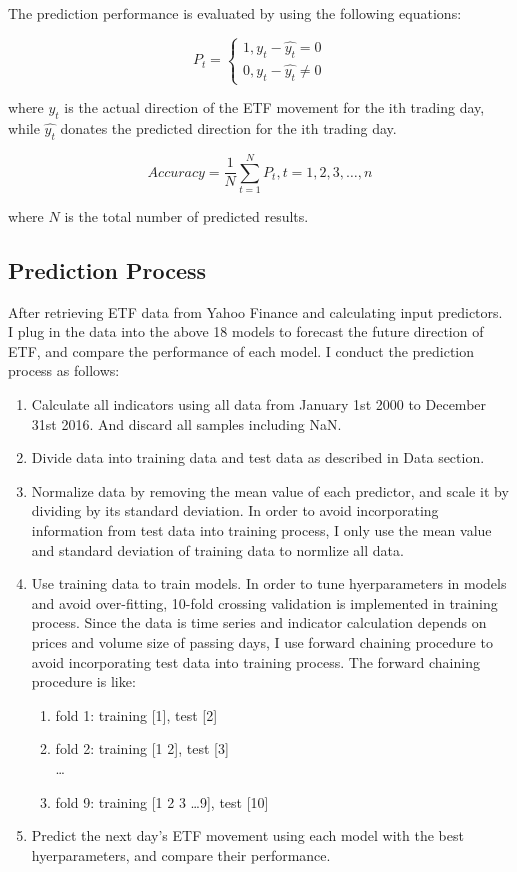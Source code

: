 \documentclass[letterpaper]{article}
\begin{document}
The prediction performance is evaluated by using the following equations:

\begin{equation}
  P_t =
  \begin{cases}
    1, y_t - \hat{y_t} = 0\\
    0, y_t - \hat{y_t} \neq 0
  \end{cases}
\end{equation}

where $y_t$ is the actual direction of the ETF movement for the ith
trading day, while $\hat{y_t}$ donates the predicted direction for the ith
trading day.

$$Accuracy = \frac {1} {N} \sum_{t=1}^{N} P_t, t = 1, 2, 3, \dots, n$$

where $N$ is the total number of predicted results.

\subsection{Prediction Process}
After retrieving ETF data from Yahoo Finance and calculating input predictors.
I plug in the data into the above 18 models to forecast the future direction of
ETF, and compare the performance of each model. I conduct the prediction
process as follows:

\begin{enumerate}
  \item Calculate all indicators using all data from January 1st 2000 to
    December 31st 2016. And discard all samples including NaN.
  \item Divide data into training data and test data as described in Data
    section.
  \item Normalize data by removing the mean value of each predictor, and scale
    it by dividing by its standard deviation. In order to avoid incorporating
    information from test data into training process, I only use the mean value
    and standard deviation of training data to normlize all data.
  \item Use training data to train models. In order to tune hyerparameters in
    models and avoid over-fitting, 10-fold crossing validation is implemented
    in training process. Since the data is time series and indicator
    calculation depends on prices and volume size of passing days, I use
    forward chaining procedure to avoid incorporating test data into training
    process. The forward chaining procedure is like:
    \begin{enumerate}
      \item fold 1: training [1], test [2]
      \item fold 2: training [1 2], test [3] \\
        \dots
      \item fold 9: training [1 2 3 \dots 9], test [10]
    \end{enumerate}
  \item Predict the next day's ETF movement using each model with the best
    hyerparameters, and compare their performance.
\end{enumerate}
\end{document}
